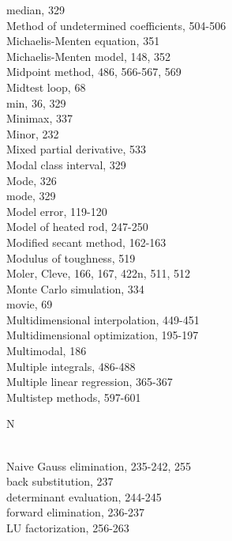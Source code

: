\documentclass[../main.tex]{subfiles}
\begin{document}
\begin{multicols}{3}
    median, 329\\
    Method of undetermined coefficients, 504-506\\
    Michaelis-Menten equation, 351\\
    Michaelis-Menten model, 148, 352\\
    Midpoint method, 486, 566-567, 569\\
    Midtest loop, 68\\
    min, 36, 329\\
    Minimax, 337\\
    Minor, 232\\
    Mixed partial derivative, 533\\
    Modal class interval, 329\\
    Mode, 326\\
    mode, 329\\
    Model error, 119-120\\
    Model of heated rod, 247-250\\
    Modified secant method, 162-163\\
    Modulus of toughness, 519\\
    Moler, Cleve, 166, 167, 422n, 511, 512\\
    Monte Carlo simulation, 334\\
    movie, 69\\
    Multidimensional interpolation, 449-451\\
    Multidimensional optimization, 195-197\\
    Multimodal, 186\\
    Multiple integrals, 486-488\\
    Multiple linear regression, 365-367\\
    Multistep methods, 597-601\vspace*{2mm}\\
    \begin{huge} N \end{huge}\\
    Naive Gauss elimination, 235-242, 255\\
    \hspace*{3mm}back substitution, 237\\
    \hspace*{3mm}determinant evaluation, 244-245\\
    \hspace*{3mm}forward elimination, 236-237\\
    \hspace*{3mm}LU factorization, 256-263\\

\end{multicols}
\end{document}
